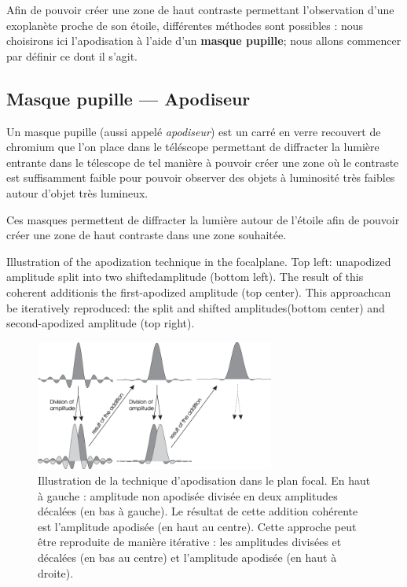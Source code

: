 Afin de pouvoir créer une zone de haut contraste permettant l'observation d'une exoplanète proche de son étoile, différentes méthodes sont possibles : nous choisirons ici l’apodisation à l’aide d’un \textbf{masque pupille}; nous allons commencer par définir ce dont il s'agit.

\subsection{Masque pupille — Apodiseur}

Un masque pupille (aussi appelé \emph{apodiseur}) est un carré en verre recouvert de chromium que l'on place dans le téléscope permettant de diffracter la lumière entrante dans le télescope de tel manière à pouvoir créer une zone où le contraste est suffisamment faible pour pouvoir observer des objets à luminosité très faibles autour d'objet très lumineux.

Ces masques permettent de diffracter la lumière autour de l’étoile afin de pouvoir créer une zone de haut contraste dans une zone souhaitée.

Illustration of the apodization technique in the focalplane. Top left: unapodized amplitude split into two shiftedamplitude (bottom left). The result of this coherent additionis the ﬁrst-apodized amplitude (top center). This approachcan be iteratively reproduced: the split and shifted amplitudes(bottom center) and second-apodized amplitude (top right).

\begin{figure}[htbp]
    \centering
    \includegraphics[width=0.7\textwidth]{figures/apod_explanation.png}
    \caption{Illustration de la technique d'apodisation dans le plan focal. En haut à gauche : amplitude non apodisée divisée en deux amplitudes décalées (en bas à gauche). Le résultat de cette addition cohérente est l'amplitude apodisée (en haut au centre). Cette approche peut être reproduite de manière itérative : les amplitudes divisées et décalées (en bas au centre) et l'amplitude apodisée (en haut à droite). }%
\end{figure}

